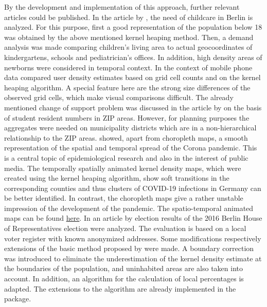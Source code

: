 By the development and implementation of this approach, further relevant articles could be published. 
In the article by \cite{Rendtel2018}, the need of childcare in Berlin is analyzed. For this purpose, first a good representation of the population  below 18 was obtained by the above mentioned kernel heaping method. Then, a demand analysis was made comparing children's living area to actual geocoordinates of kindergartens, schools and pediatrician's offices. In addition, high density areas of newborns were considered in temporal context. 
In the context of mobile phone data \cite{Hadam2020} compared user density estimates based on grid cell counts and on the kernel heaping algorithm.
A special feature here are the strong size differences of the observed grid cells, which make visual comparisons difficult. 
The already mentioned change of support problem was discussed in the article by \cite{StudentResidents} on the basis of student resident numbers in ZIP areas. However, for planning purposes the aggregates were needed on municipality districts which are in a non-hierarchical relationship to the ZIP areas. 
\cite{Rendtel2021} showed, apart from choropleth maps, a smooth representation of the spatial and temporal spread of the Corona pandemic. This is a central topic of epidemiological research and also in the interest of public media.
The temporally spatially animated kernel density maps, which were created using the kernel heaping algorithm, show soft transitions in the corresponding counties and thus clusters of COVID-19 infections in Germany can be better identified. In contrast, the choropleth maps give a rather unstable impression of the development of the pandemic. 
The spatio-temporal animated maps can be found \hyperlink{https://www.inwt-statistics.com/blog/covid-19_heat-map_of-local_7-day_incidences_over_time}{here}.
In an article by \cite{KHCompositeData} election results of the 2016 Berlin House of Representatives election were analyzed. The evaluation is based on a local voter register with known anonymized addresses. Some modifications respectively extensions of the basic method proposed by \cite{MigranteAndAgedPeople} were made. A boundary correction was introduced to eliminate the underestimation of the kernel density estimate at the boundaries of the population, and uninhabited areas are also taken into account. In addition, an algorithm for the calculation of local percentages is adapted. The extensions to the algorithm are already implemented in the \hyperlink{https://cran.r-project.org/web/packages/Kernelheaping/index.html}{} package. 



